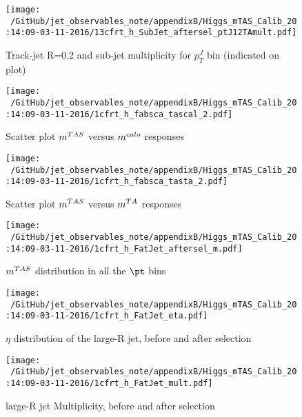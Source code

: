 \begin{figure}

\texttt{[image: ~/GitHub/jet\_observables\_note/appendixB/Higgs\_mTAS\_Calib\_20:14:09-03-11-2016/13cfrt\_h\_SubJet\_aftersel\_ptJ12TAmult.pdf]}
\caption{Track-jet R=0.2 and sub-jet multiplicity for $p_{T}^{J}$ bin (indicated on plot) }

\end{figure}

\clearpage %

\begin{figure}

\texttt{[image: ~/GitHub/jet\_observables\_note/appendixB/Higgs\_mTAS\_Calib\_20:14:09-03-11-2016/1cfrt\_h\_fabsca\_tascal\_2.pdf]}
\caption{Scatter plot $m^{TAS}$ versus $m^{calo}$ responses}

\end{figure}
 
\begin{figure}
 
\texttt{[image: ~/GitHub/jet\_observables\_note/appendixB/Higgs\_mTAS\_Calib\_20:14:09-03-11-2016/1cfrt\_h\_fabsca\_tasta\_2.pdf]}
\caption{Scatter plot $m^{TAS}$ versus $m^{TA}$ responses}
 
\end{figure}
 
\begin{figure}
 
\texttt{[image: ~/GitHub/jet\_observables\_note/appendixB/Higgs\_mTAS\_Calib\_20:14:09-03-11-2016/1cfrt\_h\_FatJet\_aftersel\_m.pdf]}
\caption{$m^{TAS}$ distribution in all the $\pt$ bins}
 
\end{figure}
 
\begin{figure}
 
\texttt{[image: ~/GitHub/jet\_observables\_note/appendixB/Higgs\_mTAS\_Calib\_20:14:09-03-11-2016/1cfrt\_h\_FatJet\_eta.pdf]}
\caption{$\eta$ distribution of the large-R jet, before and after selection}
 
\end{figure}

\begin{figure}
 
\texttt{[image: ~/GitHub/jet\_observables\_note/appendixB/Higgs\_mTAS\_Calib\_20:14:09-03-11-2016/1cfrt\_h\_FatJet\_mult.pdf]}
\caption{large-R jet Multiplicity, before and after selection}
 
\end{figure}
 
